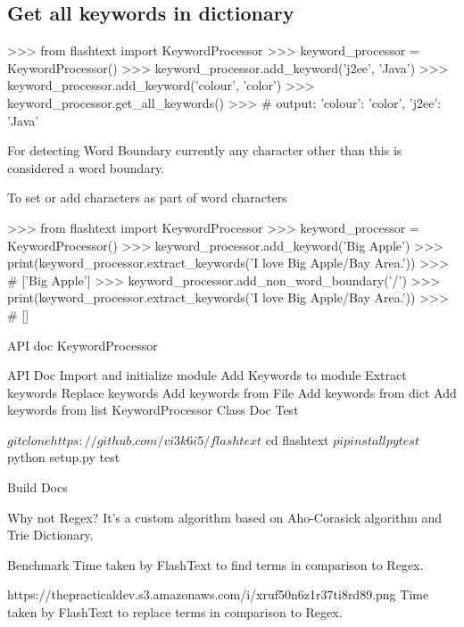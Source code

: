 \documentclass{article}
\begin{document}
\subsection{Get all keywords in dictionary}
\begin{ipythoncode}

>>> from flashtext import KeywordProcessor
>>> keyword_processor = KeywordProcessor()
>>> keyword_processor.add_keyword('j2ee', 'Java')
>>> keyword_processor.add_keyword('colour', 'color')
>>> keyword_processor.get_all_keywords()
>>> # output: {'colour': 'color', 'j2ee': 'Java'}
\end{ipythoncode}

For detecting Word Boundary currently any character other than this  is considered a word boundary.

To set or add characters as part of word characters
\begin{ipythoncode}

>>> from flashtext import KeywordProcessor
>>> keyword_processor = KeywordProcessor()
>>> keyword_processor.add_keyword('Big Apple')
>>> print(keyword_processor.extract_keywords('I love Big Apple/Bay Area.'))
>>> # ['Big Apple']
>>> keyword_processor.add_non_word_boundary('/')
>>> print(keyword_processor.extract_keywords('I love Big Apple/Bay Area.'))
>>> # []
\end{ipythoncode}

API doc
KeywordProcessor

API Doc
Import and initialize module
Add Keywords to module
Extract keywords
Replace keywords
Add keywords from File
Add keywords from dict
Add keywords from list
KeywordProcessor Class Doc
Test
\begin{bashcode}
$ git clone https://github.com/vi3k6i5/flashtext
$ cd flashtext
$ pip install pytest
$ python setup.py test
\end{bashcode}
Build Docs
Why not Regex?
It’s a custom algorithm based on Aho-Corasick algorithm and Trie Dictionary.

Benchmark
Time taken by FlashText to find terms in comparison to Regex.

https://thepracticaldev.s3.amazonaws.com/i/xruf50n6z1r37ti8rd89.png
Time taken by FlashText to replace terms in comparison to Regex.
\end{document}
